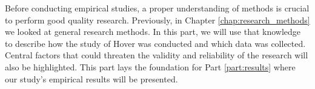 Before conducting empirical studies, a proper understanding of methods is crucial to perform good quality research. Previously, in Chapter \ref{chap:research_methods} we looked at general research methods. In this part, we will use that knowledge to describe how the study of Hover was conducted and which data was collected. Central factors that could threaten the validity and reliability of the research will also be highlighted. This part lays the foundation for Part \ref{part:results} where our study’s empirical results will be presented.





